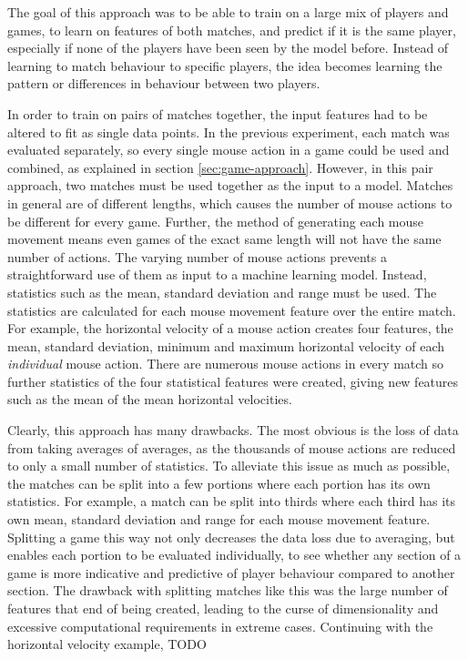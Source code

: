 \documentclass[Report.tex]{subfiles}
\begin{document}
The goal of this approach was to be able to train on a large mix of players and games, to learn on features of both matches, and predict if it is the same player, especially if none of the players have been seen by the model before. Instead of learning to match behaviour to specific players, the idea becomes learning the pattern or differences in behaviour between two players. 

In order to train on pairs of matches together, the input features had to be altered to fit as single data points. In the previous experiment, each match was evaluated separately, so every single mouse action in a game could be used and combined, as explained in section \ref{sec:game-approach}. However, in this pair approach, two matches must be used together as the input to a model. Matches in general are of different lengths, which causes the number of mouse actions to be different for every game. Further, the method of generating each mouse movement means even games of the exact same length will not have the same number of actions. The varying number of mouse actions prevents a straightforward use of them as input to a machine learning model. Instead, statistics such as the mean, standard deviation and range must be used. The statistics are calculated for each mouse movement feature over the entire match. For example, the horizontal velocity of a mouse action creates four features, the mean, standard deviation, minimum and maximum horizontal velocity of each \textit{individual} mouse action. There are numerous mouse actions in every match so further statistics of the four statistical features were created, giving new features such as the mean of the mean horizontal velocities. 

Clearly, this approach has many drawbacks. The most obvious is the loss of data from taking averages of averages, as the thousands of mouse actions are reduced to only a small number of statistics. To alleviate this issue as much as possible, the matches can be split into a few portions where each portion has its own statistics. For example, a match can be split into thirds where each third has its own mean, standard deviation and range for each mouse movement feature. Splitting a game this way not only decreases the data loss due to averaging, but enables each portion to be evaluated individually, to see whether any section of a game is more indicative and predictive of player behaviour compared to another section. The drawback with splitting matches like this was the large number of features that end of being created, leading to the curse of dimensionality and excessive computational requirements in extreme cases. Continuing with the horizontal velocity example, TODO
\end{document}
